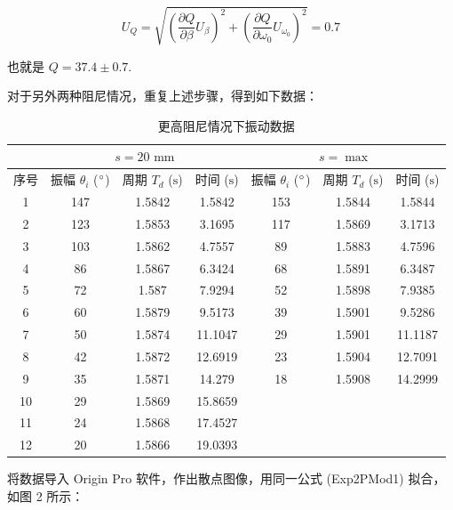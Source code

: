 \documentclass{THUexprep}
\begin{document}
\begin{equation}
    U_Q = \sqrt{\left(\frac{\partial Q}{\partial \beta}U_\beta\right)^2+\left(\frac{\partial Q}{\partial \omega_0}U_{\omega_0}\right)^2} = 0.7
\end{equation}

也就是 $Q=37.4\pm0.7$.

对于另外两种阻尼情况，重复上述步骤，得到如下数据：

\begin{longtable}{|c|c|c|c|c|c|c|}
  \caption{更高阻尼情况下振动数据} \\
    \hline
       & \multicolumn{3}{c|}{$s = 20\text{ mm}$} & \multicolumn{3}{c|}{$s = \max$} \\ \cline{1-7}
    \hline
    序号 & 振幅 $\theta_i$ ($\degree$) & 周期 $T_d$ ($\text{s}$) & 时间 ($\text{s}$) & 振幅 $\theta_i$ ($\degree$) & 周期 $T_d$ ($\text{s}$) & 时间 ($\text{s}$) \\
    \hline
    1     & 147   & 1.5842 & 1.5842 & 153   & 1.5844 & 1.5844 \\
    \hline
    2     & 123   & 1.5853 & 3.1695 & 117   & 1.5869 & 3.1713 \\
    \hline
    3     & 103   & 1.5862 & 4.7557 & 89    & 1.5883 & 4.7596 \\
    \hline
    4     & 86    & 1.5867 & 6.3424 & 68    & 1.5891 & 6.3487 \\
    \hline
    5     & 72    & 1.587 & 7.9294 & 52    & 1.5898 & 7.9385 \\
    \hline
    6     & 60    & 1.5879 & 9.5173 & 39    & 1.5901 & 9.5286 \\
    \hline
    7     & 50    & 1.5874 & 11.1047 & 29    & 1.5901 & 11.1187 \\
    \hline
    8     & 42    & 1.5872 & 12.6919 & 23    & 1.5904 & 12.7091 \\
    \hline
    9     & 35    & 1.5871 & 14.279 & 18    & 1.5908 & 14.2999 \\
    \hline
    10    & 29    & 1.5869 & 15.8659 &       &       &  \\
    \hline
    11    & 24    & 1.5868 & 17.4527 &       &       &  \\
    \hline
    12    & 20    & 1.5866 & 19.0393 &       &       &  \\
    \hline
\end{longtable}

将数据导入 Origin Pro 软件，作出散点图像，用同一公式 (Exp2PMod1) 拟合，如图 2 所示：
\end{document}
